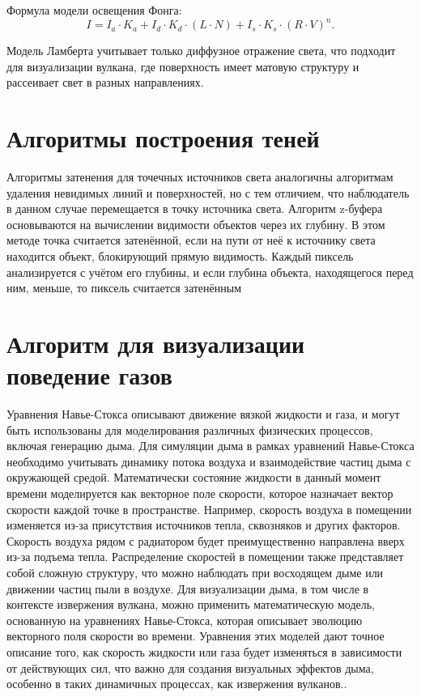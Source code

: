 Формула модели освещения Фонга:
$$
I = I_a \cdot K_a + I_d \cdot K_d \cdot (L \cdot N) + I_s \cdot K_s \cdot (R \cdot V)^n.
$$

Модель Ламберта учитывает только диффузное отражение света, что подходит для визуализации вулкана, где поверхность имеет матовую структуру и рассеивает свет в разных направлениях.

\section{Алгоритмы построения теней}
Алгоритмы затенения для точечных источников света аналогичны алгоритмам удаления невидимых линий и поверхностей, но с тем отличием, что наблюдатель в данном случае перемещается в точку источника света. Алгоритм z-буфера основываются на вычислении видимости объектов через их глубину. В этом методе точка считается затенённой, если на пути от неё к источнику света находится объект, блокирующий прямую видимость. Каждый пиксель анализируется с учётом его глубины, и если глубина объекта, находящегося перед ним, меньше, то пиксель считается затенённым

\section{Алгоритм для визуализации поведение газов}
Уравнения Навье-Стокса описывают движение вязкой жидкости и газа, и могут быть использованы для моделирования различных физических процессов, включая генерацию дыма. Для симуляции дыма в рамках уравнений Навье-Стокса необходимо учитывать динамику потока воздуха и взаимодействие частиц дыма с окружающей средой.
Математически состояние жидкости в данный момент времени моделируется как векторное поле скорости, которое назначает вектор скорости каждой точке в пространстве. Например, скорость воздуха в помещении изменяется из-за присутствия источников тепла, сквозняков и других факторов. Скорость воздуха рядом с радиатором будет преимущественно направлена вверх из-за подъема тепла. Распределение скоростей в помещении также представляет собой сложную структуру, что можно наблюдать при восходящем дыме или движении частиц пыли в воздухе. Для визуализации дыма, в том числе в контексте извержения вулкана, можно применить математическую модель, основанную на уравнениях Навье-Стокса, которая описывает эволюцию векторного поля скорости во времени. Уравнения этих моделей дают точное описание того, как скорость жидкости или газа будет изменяться в зависимости от действующих сил, что важно для создания визуальных эффектов дыма, особенно в таких динамичных процессах, как извержения вулканов..~\cite{lit3} 

